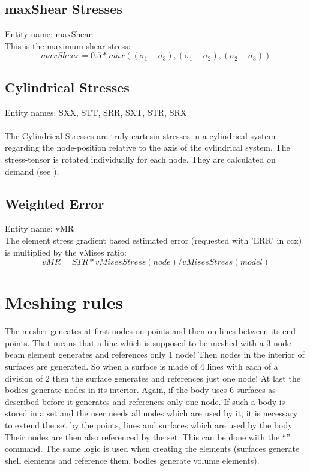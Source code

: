 \documentclass{article}
\begin{document}
\subsection{\label{maxShear Stress}maxShear Stresses}
Entity name: maxShear\\
This is the maximum shear-stress:
\[ maxShear = 0.5 * max( (\sigma_{1} - \sigma_{3}),(\sigma_{1} - \sigma_{2}),(\sigma_{2} - \sigma_{3}) )\]

\subsection{\label{Cylindrical Stresses}Cylindrical Stresses}
Entity names: SXX, STT, SRR, SXT, STR, SRX\\\\
The Cylindrical Stresses are truly cartesin stresses in a cylindrical system regarding the node-position relative to the axis of the cylindrical system. The stress-tensor is rotated individually for each node. They are calculated on demand (see ).

\subsection{\label{Weighted Error}Weighted Error}
Entity name: vMR\\
The element stress gradient based estimated error (requested with 'ERR' in
ccx) is multiplied by the vMises ratio:
\[ vMR = STR * vMisesStress(node) / vMisesStress(model)\]

\section{\label{Meshing rules}Meshing rules}
The mesher geneates at first nodes on points and then on lines between its end points. That means that a line which is supposed to be meshed with a 3 node beam element generates and references only 1 node! Then nodes in the interior of surfaces are generated. So when a surface is made of 4 lines with each of a division of 2 then the surface generates and references just one node! At last the bodies generate nodes in its interior. Again, if the body uses 6 surfaces as described before it generates and references only one node. If such a body is stored in a set and the user needs all nodes which are used by it, it is necessary to extend the set by the points, lines and surfaces which are used by the body. Their nodes are then also referenced by the set. This can be done with the ``'' command. The same logic is used when creating the elements (surfaces generate shell elements and reference them, bodies generate volume elements).
\end{document}
